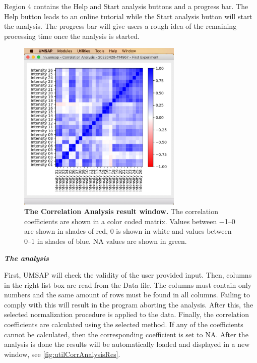 Region \num{4} contains the Help and Start analysis buttons and a progress bar. The Help button leads to an online tutorial while the Start analysis button will start the analysis. The progress bar will give users a rough idea of the remaining processing time once the analysis is started.

\begin{figure}[h]
	\centering
	\includegraphics[width=0.7\textwidth]{./IMAGES/UTIL-CORR-WINDOW/util-corr-res.jpg}	    
	\caption[The Correlation Analysis result window]{\textbf{The Correlation Analysis result window.} The correlation coefficients are shown in a color coded matrix. Values between \numrange{-1}{0} are shown in shades of red, \num{0} is shown in white and values between \numrange{0}{1} in shades of blue. NA values are shown in green.}
	\label{fig:utilCorrAnalysisRes}
	\vspace{-5pt} 	
\end{figure} 

\textit{\textbf{The analysis}}

First, UMSAP will check the validity of the user provided input. Then, columns in the right list box are read from the Data file. The columns must contain only numbers and the same amount of rows must be found in all columns. Failing to comply with this will result in the program aborting the analysis. After this, the selected normalization procedure is applied to the data. Finally, the correlation coefficients are calculated using the selected method. If any of the coefficients cannot be calculated, then the corresponding coefficient is set to NA. After the analysis is done the results will be automatically loaded and displayed in a new window, see \autoref{fig:utilCorrAnalysisRes}. 

